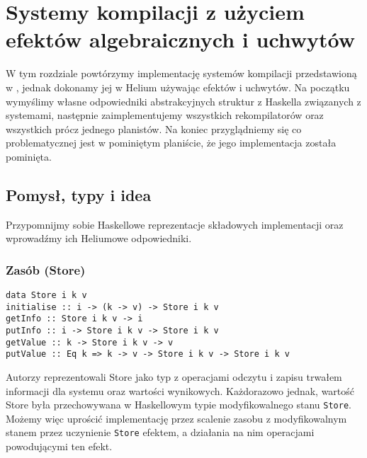 
\newcommand{\haskinl}[1]{\lstinline[style=haskell-inl]{#1}}
\newcommand{\helinl}[1]{\lstinline[style=Haleff-inl]{#1}}

\chapter{Systemy kompilacji z użyciem efektów algebraicznych i uchwytów}
\label{chapter-bsue}

W tym rozdziale powtórzymy implementację systemów kompilacji przedstawioną w \BSaLC\cite{mokhov2018build}, jednak dokonamy jej w Helium używając efektów i uchwytów. Na początku wymyślimy własne odpowiedniki abstrakcyjnych struktur z Haskella związanych z systemami, następnie zaimplementujemy wszystkich rekompilatorów oraz wszystkich prócz jednego planistów. Na koniec przyglądniemy się co problematycznej jest w pominiętym planiście, że jego implementacja została pominięta.

\section{Pomysł, typy i idea}

Przypomnijmy sobie Haskellowe reprezentacje składowych implementacji oraz wprowadźmy ich Heliumowe odpowiedniki.

\subsection{Zasób (Store)}

\begin{lstlisting}[style=haskell-style]
data Store i k v
initialise :: i -> (k -> v) -> Store i k v
getInfo :: Store i k v -> i
putInfo :: i -> Store i k v -> Store i k v
getValue :: k -> Store i k v -> v
putValue :: Eq k => k -> v -> Store i k v -> Store i k v
\end{lstlisting}

Autorzy \BSaLC\cite{mokhov2018build} reprezentowali Store jako typ z operacjami odczytu i zapisu trwałem informacji dla systemu oraz wartości wynikowych. Każdorazowo jednak, wartość Store była przechowywana w Haskellowym typie modyfikowalnego stanu \haskinl{Store}. Możemy więc uprościć implementację przez scalenie zasobu z modyfikowalnym stanem przez uczynienie \haskinl{Store} efektem, a działania na nim operacjami powodującymi ten efekt.



